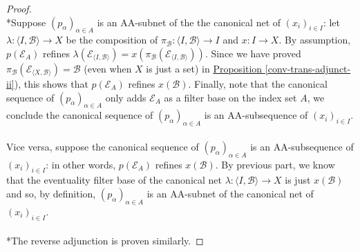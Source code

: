 \documentclass{treatise}
\begin{document}
\begin{proof} \ \\
*Suppose $(p_\alpha)_{\alpha \in A}$ is an AA-subnet of the the canonical net of $(x_i)_{i \in I}$: let $\lambda : \langle I, \mathcal{B} \rangle \to X$ be the composition of $\pi_\mathcal{B}: \langle I, \mathcal{B} \rangle \to I$ and $x: I \to X$. By assumption, $p(\mathcal{E}_A)$ refines $\lambda(\mathcal{E}_{\langle I, \mathcal{B} \rangle}) = x(\pi_\mathcal{B}(\mathcal{E}_{\langle I, \mathcal{B} \rangle}))$. Since we have proved  $\pi_\mathcal{B}(\mathcal{E}_{\langle X, \mathcal{B} \rangle}) = \mathcal{B}$ (even when $X$ is just a set) in \hyperref[conv-trans-adjunct-ii]{Proposition \ref*{conv-trans-adjunct-ii}}), this shows that $p(\mathcal{E}_A)$ refines $x(\mathcal{B})$. Finally, note that the canonical sequence of $(p_\alpha)_{\alpha \in A}$ only adds $\mathcal{E}_A$ as a filter base on the index set $A$, we conclude the canonical sequence of $(p_\alpha)_{\alpha \in A}$ is an AA-subsequence of $(x_i)_{i \in I}$.
\\
\\
Vice versa, suppose the canonical sequence of $(p_\alpha)_{\alpha \in A}$ is an AA-subsequence of $(x_i)_{i \in I}$: in other words, $p(\mathcal{E}_A)$ refines $x(\mathcal{B})$. By previous part, we know that the eventuality filter base of the canonical net $\lambda: \langle I, \mathcal{B} \rangle \to X$ is just $x(\mathcal{B})$ and so, by definition, $(p_\alpha)_{\alpha \in A}$ is an AA-subnet of the canonical net of $(x_i)_{i \in I}$.
\\
\\
*The reverse adjunction is proven similarly.
\end{proof}
\end{document}
